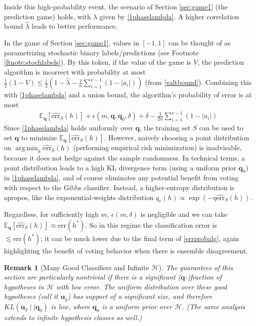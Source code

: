 \documentclass{article}[12pt]
\theoremstyle{named}
\newtheorem{nremark}{Remark}
\newcommand{\vu}{\mathbf{u}}    %
\newcommand{\vq}{\mathbf{q}}
\DeclareMathOperator*{\argmin}{arg\,min}
\newcommand{\evp}[2]{\mathbb{E}_{#2} \left[#1\right]} %
\newcommand{\abs}[1]{\left| #1 \right|}
\newcommand{\err}[1]{\mbox{err}\left(#1\right)}
\newcommand{\emperr}[2]{\widehat{\mbox{err}}_{#2} \left(#1\right)}
\newcommand*{\qedinpw}{\hfill\ensuremath{\square}} %
\newcommand{\expp}[1]{\exp \left(#1\right)}
\newcommand{\cH}{\mathcal{H}}
\newcommand{\lrp}[1]{\left(#1\right)}
\begin{document}
Inside this high-probability event, the scenario of Section \ref{sec:game1} (the prediction game) holds, 
with $\lambda$ given by \eqref{1phaselambda}. 
A higher correlation bound $\hat{\lambda}$ leads to better performance. 

In the game of Section \ref{sec:game1}, values in $[-1,1]$ can be thought of as parametrizing stochastic 
binary labels/predictions (see Footnote \ref{ftnote:stochlabels}).
By this token, if the value of the game is $V$, 
the prediction algorithm is incorrect with probability at most 
$\frac{1}{2} \lrp{1 - V} \leq \frac{1}{2} \lrp{1 - \hat{\lambda} - \frac{1}{n} \sum_{i=1}^{v-1} \lrp{1 - \abs{a_i}} }$
(from \eqref{valtbound}). 
Combining this with \eqref{1phaselambda} and a union bound, the algorithm's probability of error is at most 
\begin{align}
\label{errprobalg}
\evp{\emperr{h}{S}}{\vq} + \epsilon (m, \vq, \vq_0, \delta) + \delta - \frac{1}{2n} \sum_{i=1}^{v-1} \lrp{1 - \abs{a_i}}
\end{align}
Since \eqref{1phaselambda} holds uniformly over $\vq$, 
the training set $S$ can be used to set $\vq$ to minimize $\evp{\emperr{h}{S}}{\vq}$. 
However, naively choosing a point distribution on $\argmin_h \emperr{h}{S}$ 
(performing empirical risk minimization) is inadvisable, 
because it does not hedge against the sample randomness. 
In technical terms, a point distribution leads to a high KL divergence term (using a uniform prior $\vq_0$) in \eqref{1phaselambda}, 
and of course eliminates any potential benefit from voting with respect to the Gibbs classifier.
Instead, a higher-entropy distribution is apropos, 
like the exponential-weights distribution $q_e (h) \propto \expp{-\eta \emperr{h}{S} }$.

Regardless, for sufficiently high $m$, 
$\epsilon (m, \delta)$ is negligible and we can take $\evp{\emperr{h}{S}}{\vq} \approx \err{h^*}$.  
So in this regime the classification error is $\lesssim \err{h^*}$; 
it can be much lower due to the final term of \eqref{errprobalg}, 
again highlighting the benefit of voting behavior when there is ensemble disagreement. 


\begin{nremark}[Many Good Classifiers and Infinite $\cH$]
The guarantees of this section are particularly nontrivial if there is a significant ($\vq$-)fraction of hypotheses in $\cH$ with low error. 
The uniform distribution over these good hypotheses (call it $\vu_g$) has support of a significant size, 
and therefore $KL \lrp{\vu_g \mid \mid \vq_0}$ is low, where $\vq_0$ is a uniform prior over $\cH$. 
(The same analysis extends to infinite hypothesis classes as well.)
\end{nremark}
\end{document}
